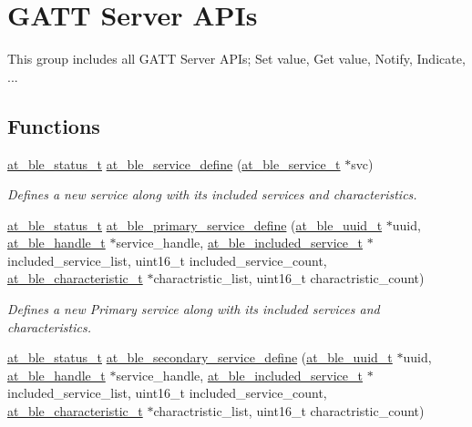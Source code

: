 \hypertarget{group__gatt__server__group}{}\section{G\+A\+TT Server A\+P\+Is}
\label{group__gatt__server__group}


This group includes all G\+A\+TT Server A\+P\+Is; Set value, Get value, Notify, Indicate, ...  


\subsection*{Functions}
\begin{DoxyCompactItemize}
\item 
\mbox{\hyperlink{group__error__codes__group_ga3b1db9b95feb157b3c188ca27fe76988}{at\+\_\+ble\+\_\+status\+\_\+t}} \mbox{\hyperlink{group__gatt__server__group_gaa7c9ccdaacf5fb00c35c361992ad3485}{at\+\_\+ble\+\_\+service\+\_\+define}} (\mbox{\hyperlink{structat__ble__service__t}{at\+\_\+ble\+\_\+service\+\_\+t}} $\ast$svc)
\begin{DoxyCompactList}\small\item\em Defines a new service along with its included services and characteristics. \end{DoxyCompactList}\item 
\mbox{\hyperlink{group__error__codes__group_ga3b1db9b95feb157b3c188ca27fe76988}{at\+\_\+ble\+\_\+status\+\_\+t}} \mbox{\hyperlink{group__gatt__server__group_ga7cf329171ab5fa04fac8efda9b37c4f1}{at\+\_\+ble\+\_\+primary\+\_\+service\+\_\+define}} (\mbox{\hyperlink{structat__ble__uuid__t}{at\+\_\+ble\+\_\+uuid\+\_\+t}} $\ast$uuid, \mbox{\hyperlink{at__ble__api_8h_abd23646d0c662860741f787efc8456f2}{at\+\_\+ble\+\_\+handle\+\_\+t}} $\ast$service\+\_\+handle, \mbox{\hyperlink{structat__ble__included__service__t}{at\+\_\+ble\+\_\+included\+\_\+service\+\_\+t}} $\ast$included\+\_\+service\+\_\+list, uint16\+\_\+t included\+\_\+service\+\_\+count, \mbox{\hyperlink{structat__ble__characteristic__t}{at\+\_\+ble\+\_\+characteristic\+\_\+t}} $\ast$charactristic\+\_\+list, uint16\+\_\+t charactristic\+\_\+count)
\begin{DoxyCompactList}\small\item\em Defines a new Primary service along with its included services and characteristics. \end{DoxyCompactList}\item 
\mbox{\hyperlink{group__error__codes__group_ga3b1db9b95feb157b3c188ca27fe76988}{at\+\_\+ble\+\_\+status\+\_\+t}} \mbox{\hyperlink{group__gatt__server__group_ga74b6ac32481172acfff34c8b7736605d}{at\+\_\+ble\+\_\+secondary\+\_\+service\+\_\+define}} (\mbox{\hyperlink{structat__ble__uuid__t}{at\+\_\+ble\+\_\+uuid\+\_\+t}} $\ast$uuid, \mbox{\hyperlink{at__ble__api_8h_abd23646d0c662860741f787efc8456f2}{at\+\_\+ble\+\_\+handle\+\_\+t}} $\ast$service\+\_\+handle, \mbox{\hyperlink{structat__ble__included__service__t}{at\+\_\+ble\+\_\+included\+\_\+service\+\_\+t}} $\ast$included\+\_\+service\+\_\+list, uint16\+\_\+t included\+\_\+service\+\_\+count, \mbox{\hyperlink{structat__ble__characteristic__t}{at\+\_\+ble\+\_\+characteristic\+\_\+t}} $\ast$charactristic\+\_\+list, uint16\+\_\+t charactristic\+\_\+count)

\end{DoxyCompactItemize}
